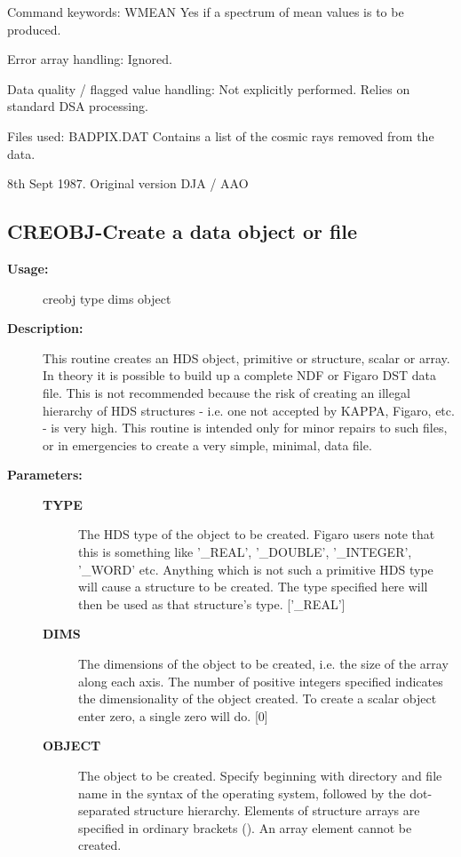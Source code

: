 \begin{description}
\begin{description}
\begin{terminalv}
 Command keywords:
    WMEAN    Yes if a spectrum of mean values is to be produced.

 Error array handling: Ignored.

 Data quality / flagged value handling:
    Not explicitly performed.  Relies on standard DSA processing.

 Files used:
    BADPIX.DAT  Contains a list of the cosmic rays removed from the data.

    8th  Sept  1987.   Original version DJA / AAO
\end{terminalv}
\end{description}
\subsection{CREOBJ-\label{CREOBJ}Create a data object or file}
\begin{description}

\item [\textbf{Usage:}]
 creobj type dims object

\item [\textbf{Description:}]
 This routine creates an HDS object, primitive or structure, scalar
 or array. In theory it is possible to build up a complete NDF or
 Figaro DST data file. This is not recommended because the risk of
 creating an illegal hierarchy of HDS structures - i.e. one not
 accepted by KAPPA, Figaro, etc. - is very high. This routine is
 intended only for minor repairs to such files, or in emergencies
 to create a very simple, minimal, data file.

\item [\textbf{Parameters:}]
\begin{description}
\item [\textbf{TYPE}]
 The HDS type of the object to be created. Figaro users note
 that this is something like '\_REAL', '\_DOUBLE', '\_INTEGER',
 '\_WORD' etc. Anything which is not such a primitive HDS type
 will cause a structure to be created. The type specified here
 will then be used as that structure's type.
 ['\_REAL']
\item [\textbf{DIMS}]
 The dimensions of the object to be created, i.e. the size of
 the array along each axis. The number of positive integers
 specified indicates the dimensionality of the object created.
 To create a scalar object enter zero, a single zero will do.
 [0]
\item [\textbf{OBJECT}]
 The object to be created. Specify beginning with directory and
 file name in the syntax of the operating system, followed by
 the dot-separated structure hierarchy. Elements of structure
 arrays are specified in ordinary brackets (). An array element
 cannot be created.
\end{description}


\end{description}
\end{description}
